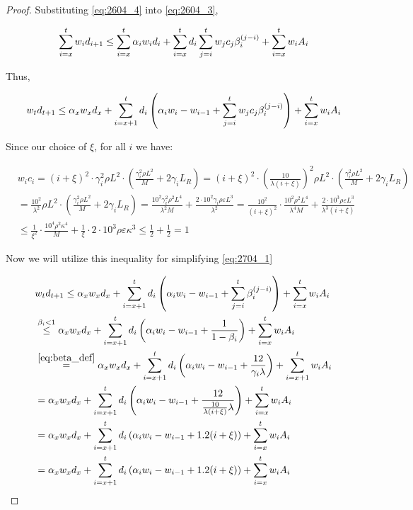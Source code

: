 \begin{proof}
Substituting \eqref{eq:2604_4} into \eqref{eq:2604_3},

\begin{align}
    \summ{i = x}{t} w_i d_{i+1}
    \leq
    \summ{i = x}{t} \alpha_i w_i d_i +
    \summ{i=x}{t} d_i \summ{j=i}{t} w_j c_j \beta_{i}^{(j-i)} + \summ{i=x}{t} w_i A_i
\end{align}

Thus,

\begin{align}
    w_t d_{t+1} \leq \alpha_x w_x d_x
    + \summ{i=x+1}{t} d_i \left(  \alpha_i w_i - w_{i-1} +  \summ{j=i}{t} w_j c_j \beta_{i}^{(j-i)} \right) + \summ{i=x}{t} w_i A_i \label{eq:2704_1}
\end{align}

Since our choice of $\xi$, for all $i$ we have:

\begin{align}
    &w_i c_i = (i + \xi)^2 \cdot \gamma_{i}^2 \rho L^2 \cdot \left( \frac{\gamma_{i}^2 \rho L^2}{M} + 2 \gamma_{i} L_R \right) 
    = (i + \xi)^2 \cdot (\frac{10 }{\lambda(i + \xi)})^2 \rho L^2 \cdot \left( \frac{\gamma_{i}^2 \rho L^2}{M} + 2 \gamma_{i} L_R \right) \\
    &= \frac{10^2}{\lambda^2} \rho L^2 \cdot \left( \frac{\gamma_{i}^2 \rho L^2}{M} + 2 \gamma_{i} L_R \right) = \frac{10^2 \gamma_{i}^2 \rho^2 L^4}{\lambda^2 M} + \frac{2\cdot10^2 \gamma_i \rho \varepsilon L^3 }{\lambda^2}
    = \frac{10^2}{{(i + \xi)}^2}\cdot \frac{10^2 \rho^2 L^4}{\lambda^4 M} + \frac{2\cdot 10^3 \rho \varepsilon L^3}{\lambda^3 (i + \xi)} \\
    &\leq \frac{1}{\xi^2} \cdot \frac{10^4 \rho^2 \kappa^4}{ M} + \frac{1}{\xi} \cdot 2\cdot 10^3 \rho \varepsilon \kappa^3 \leq \frac{1}{2} + \frac{1}{2} = 1
\end{align}

Now we will utilize this inequality for simplifying \eqref{eq:2704_1}

\begin{align}
    &w_t d_{t+1} \leq \alpha_x w_x d_x
    + \summ{i=x+1}{t} d_i \left(  \alpha_i w_i - w_{i-1} + \summ{j=i}{t}\beta_{i}^{(j-i)} \right) + \summ{i=x}{t} w_i A_i \\
    &\overset{\beta_i < 1}{\leq}
    \alpha_x w_x d_x +
    \summ{i=x+1}{t} d_i \left(  \alpha_i w_i - w_{i-1} +  \frac{1}{1 - \beta_i} \right) + \summ{i=x}{t} w_i A_i \\
    &\overset{\eqref{eq:beta_def}}{=}
    \alpha_x w_x d_x +
    \summ{i=x+1}{t} d_i \left(  \alpha_i w_i - w_{i-1} + \frac{12}{\gamma_i \lambda} \right) + \summ{i=x+1}{t} w_i A_i \\
    &= 
    \alpha_x w_x d_x +
    \summ{i=x+1}{t} d_i \left(  \alpha_i w_i - w_{i-1} + \frac{12}{\frac{10}{\lambda(i+\xi)} \lambda} \right) + \summ{i=x}{t} w_i A_i \\
    &= \alpha_x w_x d_x +
    \summ{i=x+1}{t} d_i \left(  \alpha_i w_i - w_{i-1} + 1.2(i + \xi) \right) + \summ{i=x}{t} w_i A_i \\
    &= \alpha_x w_x d_x +
    \summ{i=x+1}{t} d_i \left(  \alpha_i w_i - w_{i-1} + 1.2(i + \xi) \right) + \summ{i=x}{t} w_i A_i
\end{align}


\end{proof}

